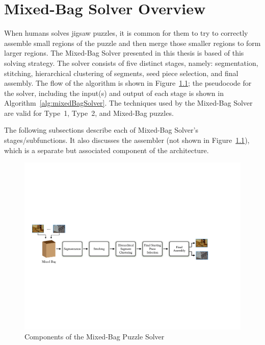 \chapter{Mixed-Bag Solver Overview}\label{chap:mixedBagSolver}

When humans solves jigsaw puzzles, it is common for them to try to correctly assemble small regions of the puzzle and then merge those smaller regions to form larger regions.  The Mixed-Bag Solver presented in this thesis is based of this solving strategy.  The solver consists of five distinct stages, namely: segmentation, stitching, hierarchical clustering of segments, seed piece selection, and final assembly.  The flow of the algorithm is shown in Figure~\ref{fig:multipuzzleSolverArchitecture}; the pseudocode for the solver, including the input(s) and output of each stage is shown in Algorithm~\ref{alg:mixedBagSolver}.  The techniques used by the Mixed-Bag Solver are valid for Type~1, Type~2, and Mixed-Bag puzzles.  

The following subsections describe each of Mixed-Bag Solver's stages/subfunctions.  It also discusses the assembler (not shown in Figure~\ref{fig:multipuzzleSolverArchitecture}), which is a separate but associated component of the architecture.

\begin{figure}[ht!]
	\centering
		\includegraphics[width=1.0\textwidth]{images/cropped_algorithm_structure_overview.pdf}
	\caption{Components of the Mixed-Bag Puzzle Solver}\label{fig:multipuzzleSolverArchitecture}
\end{figure}

